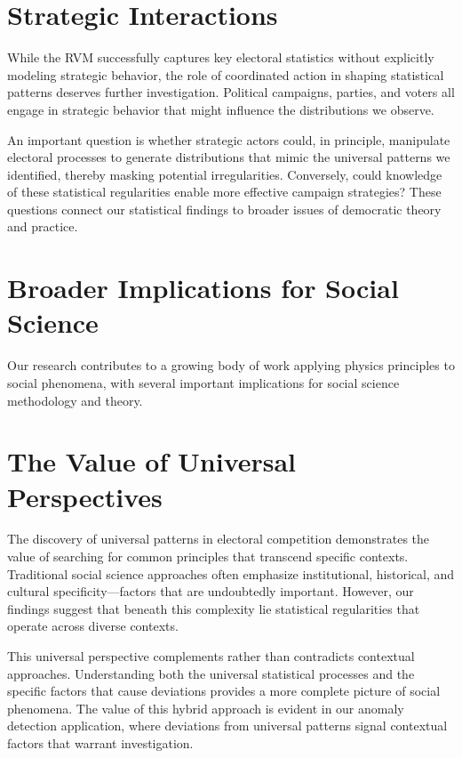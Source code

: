 \section{Strategic Interactions}

While the RVM successfully captures key electoral statistics without explicitly modeling strategic behavior, the role of coordinated action in shaping statistical patterns deserves further investigation. Political campaigns, parties, and voters all engage in strategic behavior that might influence the distributions we observe. 

An important question is whether strategic actors could, in principle, manipulate electoral processes to generate distributions that mimic the universal patterns we identified, thereby masking potential irregularities. Conversely, could knowledge of these statistical regularities enable more effective campaign strategies? These questions connect our statistical findings to broader issues of democratic theory and practice.

\section{Broader Implications for Social Science}

Our research contributes to a growing body of work applying physics principles to social phenomena, with several important implications for social science methodology and theory.

\section{The Value of Universal Perspectives}

The discovery of universal patterns in electoral competition demonstrates the value of searching for common principles that transcend specific contexts. Traditional social science approaches often emphasize institutional, historical, and cultural specificity—factors that are undoubtedly important. However, our findings suggest that beneath this complexity lie statistical regularities that operate across diverse contexts.

This universal perspective complements rather than contradicts contextual approaches. Understanding both the universal statistical processes and the specific factors that cause deviations provides a more complete picture of social phenomena. The value of this hybrid approach is evident in our anomaly detection application, where deviations from universal patterns signal contextual factors that warrant investigation.

